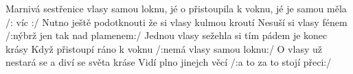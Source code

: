 \begin{TEXT}{Marnivá sestřenice}
\SLOKA {} vlasy samou loknu, jé  \NL
{}o přistoupila k voknu, jé  je \NL
{} samou  měla \NL
/:  víc  :/     
\SLOKA Nutno ještě podotknouti \NL
že si vlasy kulmou kroutí \NL
Nesuší si vlasy fénem \NL
/:nýbrž jen tak nad plamenem:/ 
\SLOKA Jednou vlasy sežehla si \NL
tím pádem je konec krásy \NL
Když přistoupí ráno k voknu \NL
/:nemá vlasy samou loknu:/ 
\SLOKA O vlasy už nestará se \NL
a diví se světa kráse \NL
Vidí plno jinejch věcí \NL
/:a to za to stojí přeci:/ \NL
\end{TEXT}
